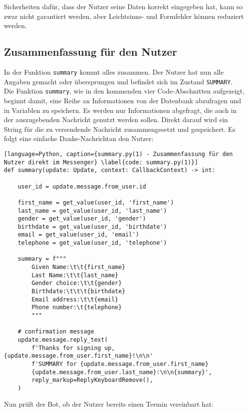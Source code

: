             Sicherheiten dafür, dass der Nutzer seine Daten korrekt eingegeben hat, kann so zwar nicht garantiert werden, aber Leichtsinns- und Formfehler können reduziert werden.
        

        \subsection{Zusammenfassung für den Nutzer} \label{Implementierung: summary.py}
            In der Funktion \verb|summary| kommt alles zusammen. Der Nutzer hat nun alle Angaben gemacht oder übersprungen und befindet sich im Zustand \verb|SUMMARY|. \\
            Die Funktion \verb|summary|, wie in den kommenden vier Code-Abschnitten aufgezeigt, beginnt damit, eine Reihe an Informationen von der Datenbank abzufragen und in Variablen zu speichern. Es werden nur Informationen abgefragt, die auch in der auszugebenden Nachricht genutzt werden sollen. Direkt darauf wird ein String für die zu versendende Nachricht zusammengesetzt und gespeichert. Es folgt eine einfache \glqq Danke-Nachricht\grqq an den Nutzer:

            \begin{lstlisting}[language=Python, caption={summary.py(1) - Zusammenfassung für den Nutzer direkt im Messenger} \label{code: summary.py(1)}]
def summary(update: Update, context: CallbackContext) -> int:
    
    user_id = update.message.from_user.id    

    first_name = get_value(user_id, 'first_name')
    last_name = get_value(user_id, 'last_name')
    gender = get_value(user_id, 'gender')
    birthdate = get_value(user_id, 'birthdate')
    email = get_value(user_id, 'email')
    telephone = get_value(user_id, 'telephone')

    summary = f"""
        Given Name:\t\t{first_name}
        Last Name:\t\t{last_name}
        Gender choice:\t\t{gender}
        Birthdate:\t\t\t{birthdate}
        Email address:\t\t{email}
        Phone number:\t{telephone}
        """

    # confirmation message
    update.message.reply_text(
        f'Thanks for signing up, {update.message.from_user.first_name}!\n\n'
        f'SUMMARY for {update.message.from_user.first_name} 
        {update.message.from_user.last_name}:\n\n{summary}',
        reply_markup=ReplyKeyboardRemove(),
    )
            \end{lstlisting}
            Nun prüft der Bot, ob der Nutzer bereits einen Termin vereinbart hat:
            
